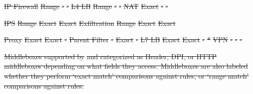 \documentclass[letterpaper,twocolumn,10pt]{article}
\newcommand{\sys}{Embark\xspace} %
\providecommand{\DIFdeltex}[1]{{\protect\color{red}\sout{#1}}}                      %
\providecommand{\DIFdelFL}[1]{\DIFdel{#1}} %
\providecommand{\DIFdel}[1]{\texorpdfstring{\DIFdeltex{#1}}{}} %
\begin{document}
\parbox[t]{1mm}{%
}
\DIFdelFL{IP Firewall}%
\DIFdelFL{Range}%
\DIFdelFL{-}%
\DIFdelFL{-}%
\DIFdelFL{L4 LB}%
\DIFdelFL{Range}%
\DIFdelFL{-}%
\DIFdelFL{-}%
\DIFdelFL{NAT}%
\DIFdelFL{Exact}%
\DIFdelFL{-}%
\DIFdelFL{-}%

\parbox[t]{1mm}{%
}
\DIFdelFL{IPS}%
\DIFdelFL{Range}%
\DIFdelFL{Exact}%
\DIFdelFL{Exact}%
\DIFdelFL{Exfiltration}%
\DIFdelFL{Range}%
\DIFdelFL{Exact}%
\DIFdelFL{Exact}%

\parbox[t]{1mm}{%
}
\DIFdelFL{Proxy}%
\DIFdelFL{Exact}%
\DIFdelFL{Exact}%
\DIFdelFL{-}%
\DIFdelFL{Parent Filter}%
\DIFdelFL{-}%
\DIFdelFL{Exact}%
\DIFdelFL{-}%
\DIFdelFL{L7 LB}%
\DIFdelFL{Exact}%
\DIFdelFL{Exact}%
\DIFdelFL{-}%
\DIFdelFL{*}%
\DIFdelFL{VPN}%
\DIFdelFL{-}%
\DIFdelFL{-}%
\DIFdelFL{-}%

{%
\DIFdelFL{Middleboxes supported by }%
\DIFdelFL{and categorized as Header, DPI, or HTTP middleboxes depending on what fields they access. Middleboxes are also labeled whether they perform `exact match' comparisons against rules, or `range match' comparisons against rules.}%
} 
\end{document}
